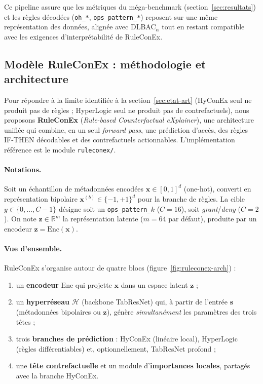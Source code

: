 \documentclass[12pt,a4paper]{article}
\begin{document}
Ce pipeline assure que les m\'etriques du m\'ega-benchmark (section~\ref{sec:resultats}) et les r\`egles d\'ecod\'ees (\texttt{oh\_*}, \texttt{ops\_pattern\_*}) reposent sur une m\^eme repr\'esentation des donn\'ees, align\'ee avec DLBAC$_\alpha$ tout en restant compatible avec les exigences d'interpr\'etabilit\'e de RuleConEx.

\subsection{Mod\`ele RuleConEx : m\'ethodologie et architecture}
\label{subsec:ruleconex-arch}

Pour r\'epondre \`a la limite identifi\'ee \`a la section~\ref{sec:etat-art} (HyConEx seul ne produit pas de r\`egles ; HyperLogic seul ne produit pas de contrefactuels), nous proposons \textbf{RuleConEx} (\textit{Rule-based Counterfactual eXplainer}), une architecture unifi\'ee qui combine, en un seul \textit{forward pass}, une pr\'ediction d'acc\`es, des r\`egles IF-THEN d\'ecodables et des contrefactuels actionnables. L'impl\'ementation r\'ef\'erence est le module \texttt{ruleconex/}.

\paragraph{Notations.}
Soit un \'echantillon de m\'etadonn\'ees encod\'ees $\bm{x}\in[0,1]^d$ (one-hot), converti en repr\'esentation bipolaire
$\bm{x}^{(b)}\in\{-1,+1\}^d$ pour la branche de r\`egles.
La cible $y\in\{0,\ldots,C-1\}$ d\'esigne soit un \texttt{ops\_pattern\_$k$} ($C=16$), soit \textit{grant}/\textit{deny} ($C=2$).
On note $\bm{z}\in\mathbb{R}^{m}$ la repr\'esentation latente ($m=64$ par d\'efaut), produite par un encodeur $\bm{z}=\mathrm{Enc}(\bm{x})$.

\paragraph{Vue d'ensemble.}
RuleConEx s'organise autour de quatre blocs (figure~\ref{fig:ruleconex-arch}) :
\begin{enumerate}[label=(\roman*)]
  \item un \textbf{encodeur} $\mathrm{Enc}$ qui projette $\bm{x}$ dans un espace latent $\bm{z}$ ;
  \item un \textbf{hyperr\'eseau} $\mathcal{H}$ (backbone TabResNet) qui, \`a partir de l'entr\'ee $\bm{s}$ (m\'etadonn\'ees bipolaires ou $\bm{z}$), g\'en\`ere \emph{simultan\'ement} les param\`etres des trois t\^etes ;
  \item trois \textbf{branches de pr\'ediction} : HyConEx (lin\'eaire local), HyperLogic (r\`egles diff\'erentiables) et, optionnellement, TabResNet profond ;
  \item une \textbf{t\^ete contrefactuelle} et un module d'\textbf{importances locales}, partag\'es avec la branche HyConEx.
\end{enumerate}
\end{document}
